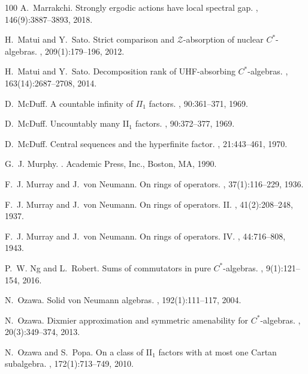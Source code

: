 \documentclass[a4paper,11pt]{amsart}
\theoremstyle{definition}
\numberwithin{equation}{section}
\numberwithin{theorem}{section}
\begin{document}
\begin{thebibliography}{100}
A.~Marrakchi.
\newblock Strongly ergodic actions have local spectral gap.
, 146(9):3887--3893, 2018.

H.~Matui and Y.~Sato.
\newblock Strict comparison and {$\mathcal{Z}$}-absorption of nuclear
  {$C^*$}-algebras.
, 209(1):179--196, 2012.

H.~Matui and Y.~Sato.
\newblock Decomposition rank of {UHF}-absorbing {$C^*$}-algebras.
, 163(14):2687--2708, 2014.

D.~McDuff.
\newblock A countable infinity of {$\Pi _{1}$} factors.
, 90:361--371, 1969.

D.~McDuff.
\newblock Uncountably many {II$_{1}$} factors.
, 90:372--377, 1969.

D.~McDuff.
\newblock Central sequences and the hyperfinite factor.
, 21:443--461, 1970.

G.~J. Murphy.
.
\newblock Academic Press, Inc., Boston, MA, 1990.

F.~J. Murray and J.~von Neumann.
\newblock On rings of operators.
, 37(1):116--229, 1936.

F.~J. Murray and J.~von Neumann.
\newblock On rings of operators. {II}.
, 41(2):208--248, 1937.

F.~J. Murray and J.~von Neumann.
\newblock On rings of operators. {IV}.
, 44:716--808, 1943.

P.~W. Ng and L.~Robert.
\newblock Sums of commutators in pure {$C^*$}-algebras.
, 9(1):121--154, 2016.

N.~Ozawa.
\newblock Solid von {N}eumann algebras.
, 192(1):111--117, 2004.

N.~Ozawa.
\newblock Dixmier approximation and symmetric amenability for {$C^*$}-algebras.
, 20(3):349--374, 2013.

N.~Ozawa and S.~Popa.
\newblock On a class of {II$_1$} factors with at most one {C}artan subalgebra.
, 172(1):713--749, 2010.


\end{thebibliography}
\end{document}
